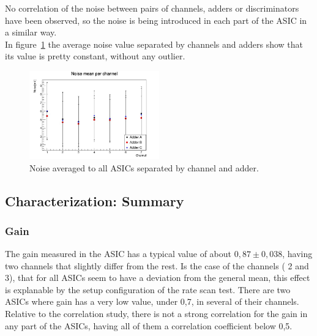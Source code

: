 \documentclass[a4paper,10pt]{book}
\begin{document}
No correlation of the noise between pairs of channels, adders or discriminators have been observed, so the noise is being introduced in each part of the ASIC in a similar way.\\
In figure~\ref{fig:noisech} the average noise value separated by channels and adders show that its value is pretty constant, without any outlier. 

\begin{figure}
\centering
 \includegraphics[width=0.5\textwidth]{./noisech.jpg}
  \caption{Noise averaged to all ASICs separated by channel and adder.}
    \label{fig:noisech}
\end{figure}


\subsection{Characterization: Summary}

\subsubsection{Gain}
The gain measured in the ASIC has a typical value of about $0,87\pm0,038$, having two channels that
slightly differ from the rest. Is the case of the channels ( 2 and 3), that for all ASICs seem to have a
deviation from the general mean, this effect is explanable by the setup configuration of the rate scan
test. There are two ASICs where gain has a very low value, under 0,7, in several of their channels.
Relative to the correlation study, there is not a strong correlation for the gain in any part of the
ASICs, having all of them a correlation coefficient below 0,5.\\
\end{document}
